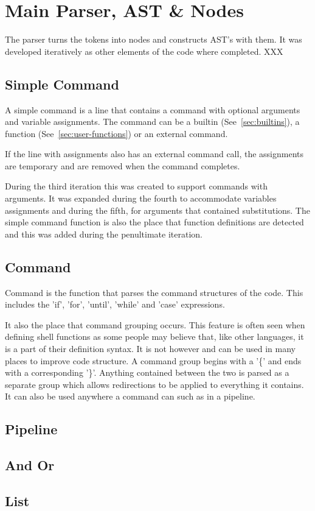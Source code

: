 \section{Main Parser, AST \& Nodes}
The parser turns the tokens into nodes and constructs AST's with them.
It was developed iteratively as other elements of the code where completed. XXX

\subsection{Simple Command}
A simple command is a line that contains a command with optional arguments and variable assignments.
The command can be a builtin (See~\ref{sec:builtins}), a function (See~\ref{sec:user-functions}) or an external command.

If the line with assignments also has an external command call, the assignments are temporary and are removed when the command completes.

During the third iteration this was created to support commands with arguments.
It was expanded during the fourth to accommodate variables assignments and during the fifth, for arguments that contained substitutions.
The simple command function is also the place that function definitions are detected and this was added during the penultimate iteration.

\subsection{Command}
Command is the function that parses the command structures of the code.
This includes the 'if', 'for', 'until', 'while' and 'case' expressions.

It also the place that command grouping occurs.
This feature is often seen when defining shell functions as some people may believe that, like other languages, it is a part of their definition syntax.
It is not however and can be used in many places to improve code structure.
A command group begins with a '\{' and ends with a corresponding '\}'.
Anything contained between the two is parsed as a separate group which allows redirections to be applied to everything it contains.
It can also be used anywhere a command can such as in a pipeline. 
\subsection{Pipeline}
\subsection{And Or}
\subsection{List}


